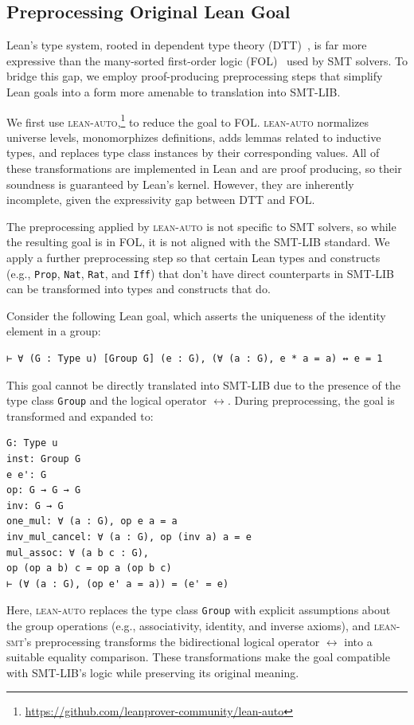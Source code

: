 \documentclass[runningheads]{llncs}
\newcommand{\tactic}{\textsc{lean-smt}\xspace}
\newcommand{\auto}{\textsc{lean-auto}\xspace}
\begin{document}
\subsection{Preprocessing Original Lean Goal}
\label{sec:preprocessing}

Lean's type system, rooted in dependent type theory (DTT)~\cite{theoremprovinginlean},
is far more expressive than the many-sorted first-order logic
(FOL)~\cite{Enderton2001} used by SMT solvers.
%
To bridge this gap, we employ proof-producing preprocessing steps
that simplify Lean goals into a form more amenable to translation into SMT-LIB.

We first use
\auto,\footnote{\url{https://github.com/leanprover-community/lean-auto}}
to reduce the goal to FOL.
%
\auto normalizes universe levels,
monomorphizes definitions, adds lemmas related to inductive types, and
replaces type class instances by their corresponding values.
%
All of these transformations are implemented in Lean and are proof producing, so their soundness is guaranteed
by Lean's kernel.
%
However, they are inherently incomplete, given the expressivity gap between DTT
and FOL.

The preprocessing applied by \auto is not specific to SMT solvers, so while the
resulting goal is in FOL, it is not aligned with the SMT-LIB standard.
%
We apply a further preprocessing step so that certain Lean types and constructs
(e.g., \texttt{Prop}, \texttt{Nat}, \texttt{Rat}, and \texttt{Iff}) that don't have
direct counterparts in SMT-LIB can be transformed into types and constructs
that do.

\begin{example}
Consider the following Lean goal, which asserts the uniqueness of the identity element in a group:
\begin{lstlisting}
⊢ ∀ (G : Type u) [Group G] (e : G), (∀ (a : G), e * a = a) ↔ e = 1
\end{lstlisting}
This goal cannot be directly translated into SMT-LIB due to the presence of the type class \texttt{Group} and the logical operator \( \leftrightarrow \).
%
During preprocessing, the goal is transformed and expanded to:
\begin{lstlisting}
G: Type u
inst: Group G
e e': G
op: G → G → G
inv: G → G
one_mul: ∀ (a : G), op e a = a
inv_mul_cancel: ∀ (a : G), op (inv a) a = e
mul_assoc: ∀ (a b c : G),
op (op a b) c = op a (op b c)
⊢ (∀ (a : G), (op e' a = a)) = (e' = e)
\end{lstlisting}
Here, \auto replaces the type class \texttt{Group} with explicit assumptions about the group operations (e.g., associativity, identity, and inverse axioms), and \tactic's preprocessing transforms the bidirectional logical operator \( \leftrightarrow \) into a suitable equality comparison. These transformations make the goal compatible with SMT-LIB's logic while preserving its original meaning.
\end{example}
\end{document}
